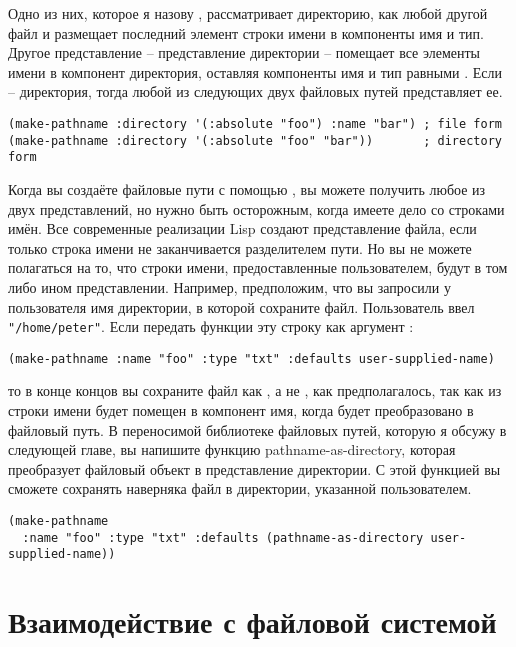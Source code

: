 Одно из них, которое я назову , рассматривает директорию, как
любой другой файл и размещает последний элемент строки имени в компоненты имя и
тип. Другое представление -- представление директории -- помещает все элементы имени в
компонент директория, оставляя компоненты имя и тип равными . Если
 -- директория, тогда любой из следующих двух файловых путей представляет
ее.

\begin{lstlisting}
(make-pathname :directory '(:absolute "foo") :name "bar") ; file form 
(make-pathname :directory '(:absolute "foo" "bar"))       ; directory form 
\end{lstlisting}

Когда вы создаёте файловые пути с помощью , вы можете получить любое
из двух представлений, но нужно быть осторожным, когда имеете дело со строками имён. Все
современные реализации Lisp создают представление файла, если только строка имени не
заканчивается разделителем пути. Но вы не можете полагаться на то, что строки имени,
предоставленные пользователем, будут в том либо ином представлении. Например, предположим,
что вы запросили у пользователя имя директории, в которой сохраните файл. Пользователь
ввел \lstinline!"/home/peter"!. Если передать функции  эту строку как
аргумент :

\begin{lstlisting}
(make-pathname :name "foo" :type "txt" :defaults user-supplied-name) 
\end{lstlisting}

то в конце концов вы сохраните файл как , а не
, как предполагалось, так как  из строки имени
будет помещен в компонент имя, когда  будет преобразовано в
файловый путь. В переносимой библиотеке файловых путей, которую я обсужу в следующей
главе, вы напишите функцию pathname-as-directory, которая преобразует файловый объект в
представление директории. С этой функцией вы сможете сохранять наверняка файл в
директории, указанной пользователем.

\begin{lstlisting}
(make-pathname 
  :name "foo" :type "txt" :defaults (pathname-as-directory user-supplied-name))
\end{lstlisting}

\section{Взаимодействие с файловой системой}

